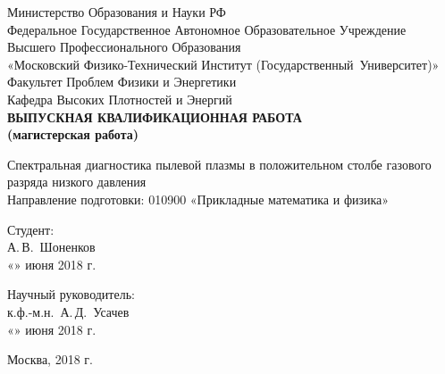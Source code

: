\begin{center}
    Министерство Образования и Науки РФ\\
    Федеральное Государственное Автономное Образовательное Учреждение Высшего Профессионального Образования\\
    «Московский Физико-Технический Институт (Государственный~Университет)»\\[15mm]

    Факультет Проблем Физики и Энергетики\\
    Кафедра Высоких Плотностей и Энергий\\[20mm]

    \textbf{
        ВЫПУСКНАЯ КВАЛИФИКАЦИОННАЯ РАБОТА\\
        (магистерская работа)\\[10mm]
    }

    Спектральная диагностика пылевой плазмы в положительном столбе газового разряда низкого давления\\[10mm]

Направление подготовки: 010900 «Прикладные математика и физика»\\[20mm]
\end{center}

\newlength{\ML}
\hfill\begin{minipage}{0.5\textwidth}
  Студент:\\
  \underline{\hspace{\ML}} А.\,В.~Шоненков\\
  «\underline{\hspace{0.7cm}}» июня 2018 г.\\[5mm]
\end{minipage}%

\hfill\begin{minipage}{0.5\textwidth}
  Научный руководитель:\\
  \underline{\hspace{\ML}} к.ф.-м.н.~А.\,Д.~Усачев\\
  «\underline{\hspace{0.7cm}}» июня 2018 г.
\end{minipage}%

\vfill

\begin{center}
  Москва, 2018 г.
\end{center}

\thispagestyle{empty}
